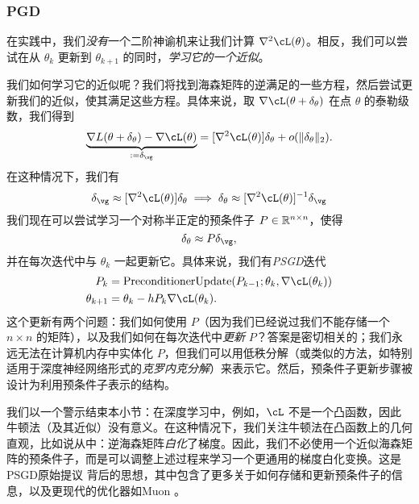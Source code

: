\documentclass[../../book-main.tex]{subfiles}
\begin{document}
\subsubsection{PGD}

在实践中，我们\textit{没有}一个二阶神谕机来让我们计算 \(\nabla^{2}\cL(\theta)\)。相反，我们可以尝试在从 \(\theta_{k}\) 更新到 \(\theta_{k + 1}\) 的同时，\textit{学习它的一个近似}。

我们如何学习它的近似呢？我们将找到海森矩阵的逆满足的一些方程，然后尝试更新我们的近似，使其满足这些方程。具体来说，取 \(\nabla \cL(\theta + \delta_{\theta})\) 在点 \(\theta\) 的泰勒级数，我们得到
\begin{equation}
    \underbrace{\nabla L(\theta + \delta_{\theta}) - \nabla \cL(\theta)}_{:= \delta_{\vg}} = [\nabla^{2} \cL(\theta)]\delta_{\theta} + o(\norm{\delta_{\theta}}_{2}).
\end{equation}
在这种情况下，我们有
\begin{equation}
    \delta_{\vg} \approx [\nabla^{2}\cL(\theta)]\delta_{\theta} \implies \delta_{\theta} \approx [\nabla^{2}\cL(\theta)]^{-1}\delta_{\vg}
\end{equation}
我们现在可以尝试学习一个对称半正定的预条件子 \(P \in \mathbb{R}^{n \times n}\)，使得
\begin{equation}
    \delta_{\theta} \approx P\delta_{\vg},
\end{equation}
并在每次迭代中与 \(\theta_{k}\) 一起更新它。具体来说，我们有\textit{PSGD}迭代
\begin{align}
    P_{k}
    &= \mathrm{PreconditionerUpdate}(P_{k - 1}; \theta_{k}, \nabla \cL(\theta_{k})) \\ 
    \theta_{k + 1}
    &= \theta_{k} - hP_{k}\nabla \cL(\theta_{k}).
\end{align}
这个更新有两个问题：我们如何使用 \(P\)（因为我们已经说过我们不能存储一个 \(n \times n\) 的矩阵），以及我们如何在每次迭代中\textit{更新} \(P\)？答案是密切相关的；我们永远无法在计算机内存中实体化 \(P\)，但我们可以用低秩分解（或类似的方法，如特别适用于深度神经网络形式的\textit{克罗内克分解}）来表示它。然后，预条件子更新步骤被设计为利用预条件子表示的结构。

我们以一个警示结束本小节：在深度学习中，例如，\(\cL\) 不是一个凸函数，因此牛顿法（及其近似）没有意义。在这种情况下，我们关注牛顿法在凸函数上的几何直观，比如说从中：逆海森矩阵\textit{白化}了梯度。因此，我们不必使用一个近似海森矩阵的预条件子，而是可以调整上述过程来学习一个更通用的梯度白化变换。这是PSGD原始提议 \cite{li2017preconditioned} 背后的思想，其中包含了更多关于如何存储和更新预条件子的信息，以及更现代的优化器如Muon \cite{liu2025muon}。
\end{document}
